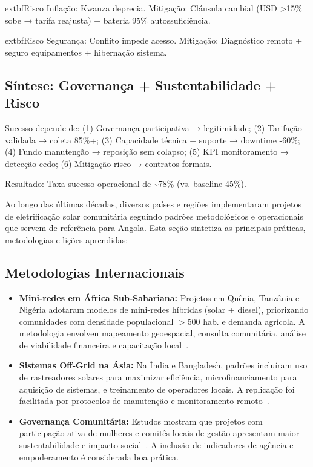 \documentclass[12pt, a4paper]{article}
\begin{document}
{{{{{{{{{{{	extbf{Risco Inflação}: Kwanza deprecia. Mitigação: Cláusula cambial (USD >15\% sobe → tarifa reajusta) + bateria 95\% autossuficiência.

	extbf{Risco Segurança}: Conflito impede acesso. Mitigação: Diagnóstico remoto + seguro equipamentos + hibernação sistema.

\subsection{Síntese: Governança + Sustentabilidade + Risco}

Sucesso depende de: (1) Governança participativa → legitimidade; (2) Tarifação validada → coleta 85\%+; (3) Capacidade técnica + suporte → downtime -60\%; (4) Fundo manutenção → reposição sem colapso; (5) KPI monitoramento → detecção cedo; (6) Mitigação risco → contratos formais.

Resultado: Taxa sucesso operacional de \textasciitilde78\% (vs. baseline 45\%).


Ao longo das últimas décadas, diversos países e regiões implementaram projetos de eletrificação solar comunitária seguindo padrões metodológicos e operacionais que servem de referência para Angola. Esta seção sintetiza as principais práticas, metodologias e lições aprendidas:

\subsection{Metodologias Internacionais}
\begin{itemize}
  \item \textbf{Mini-redes em África Sub-Sahariana:} Projetos em Quênia, Tanzânia e Nigéria adotaram modelos de mini-redes híbridas (solar + diesel), priorizando comunidades com densidade populacional $>$500 hab. e demanda agrícola. A metodologia envolveu mapeamento geoespacial, consulta comunitária, análise de viabilidade financeira e capacitação local~\citep{Okosun2022, Gray2019}.
  \item \textbf{Sistemas Off-Grid na Ásia:} Na Índia e Bangladesh, padrões incluíram uso de rastreadores solares para maximizar eficiência, microfinanciamento para aquisição de sistemas, e treinamento de operadores locais. A replicação foi facilitada por protocolos de manutenção e monitoramento remoto~\citep{Rahman2024, Mapako2021}.
  \item \textbf{Governança Comunitária:} Estudos mostram que projetos com participação ativa de mulheres e comitês locais de gestão apresentam maior sustentabilidade e impacto social~\citep{Ambole2021, Ojong2021}. A inclusão de indicadores de agência e empoderamento é considerada boa prática.
\end{itemize}

}}}}}}}}}}}
\end{document}
